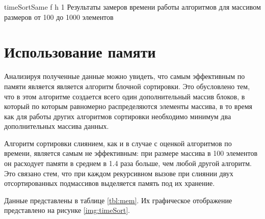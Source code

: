 {timeSortSame} %
{f} %
{h} %
{1\textwidth} %
{Результаты замеров времени работы алгоритмов для массивом размеров от 100 до 1000 элементов} %

\clearpage

\section{Использование памяти}

Анализируя полученные данные можно увидеть, что самым эффективным по памяти является является алгоритм блочной сортировки. Это обусловлено тем, что в
этом алгоритме создается всего один дополнительный массив блоков, в который по которым равномерно распределяются элементы массива, в то время как для работы других алгоритмов сортировки необходимо минимум два дополнительных массива данных.

Алгоритм сортировки слиянием, как и в случае с оценкой алгоритмов по времени,
является самым не эффективным: при размере массива в 100 элементов он расходует памяти в среднем в 1.4 раза больше, чем любой другой алгоритм. Это связано стем, что при каждом рекурсивном вызове при слиянии двух отсортированных подмассивов выделяется память под их хранение.

Данные представлены в таблице \ref{tbl:mem}. Их графическое отображение представлено на рисунке \ref{img:timeSort}.

